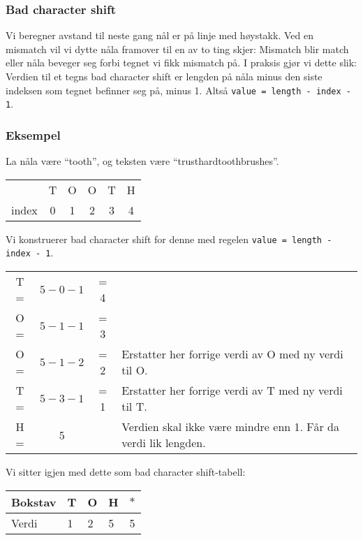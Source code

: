 	\subsubsection{Bad character shift}
		Vi beregner avstand til neste gang nål er på linje med høystakk.
		Ved en mismatch vil vi dytte nåla framover til en av to ting skjer: Mismatch blir match eller nåla beveger seg forbi tegnet vi fikk mismatch på.
		I praksis gjør vi dette slik: Verdien til et tegns bad character shift er lengden på nåla minus den siste indeksen som tegnet befinner seg på, minus 1. Altså \verb|value = length - index - 1|.
		
		\subsubsection*{Eksempel}
		La nåla være ``tooth'', og teksten være ``trusthardtoothbrushes''.
		
		\begin{center}
			\begin{tabular}{c c c c c c}
				& T & O & O & T & H \\
				index & 0 & 1 & 2 & 3 & 4
			\end{tabular}
		\end{center}

		Vi konstruerer bad character shift for denne med regelen \verb|value = length - index - 1|.

\begin{center}
\begin{tabular}{cccl}
T = & $5-0-1$&= 4\\
O = & $5-1-1$&= 3\\
O = & $5-1-2$&= 2&Erstatter her forrige verdi av O med ny verdi til O.\\
T = &$5-3-1$& = 1&Erstatter her forrige verdi av T med ny verdi til T.\\
H = &5 &&Verdien skal ikke være mindre enn 1. Får da verdi lik lengden.\\
\end{tabular}

Vi sitter igjen med dette som bad character shift-tabell: \newline
\begin{tabular}{l|llll}
Bokstav&T&O&H&$*$\\
\hline
Verdi&1&2&5&5\\
\end{tabular}
\end{center}

